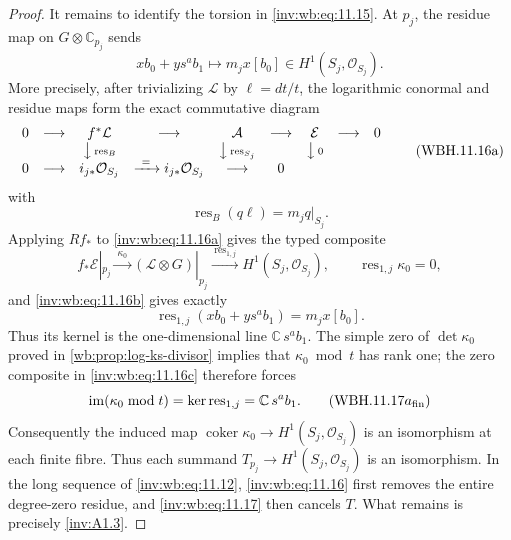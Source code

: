 \begin{proof}
It remains to identify the torsion in \eqref{inv:wb:eq:11.15}.  At $p_j$, the residue map on
$G\otimes\mathbb C_{p_j}$ sends
\[
 x b_0+y s^ab_1\longmapsto m_jx[b_0]
 \in H^1(S_j,\mathcal O_{S_j}).
\tag{WBH.11.17}\label{inv:wb:eq:11.17}
\]
More precisely, after trivializing $\mathcal L$ by
$\ell=dt/t$, the logarithmic conormal and residue maps form the exact
commutative diagram
\[
\begin{array}{ccccccccc}
0&\longrightarrow&f^*\mathcal L&\longrightarrow&\mathcal A
 &\longrightarrow&\mathcal E&\longrightarrow&0\\
&&\big\downarrow\,{\scriptstyle\operatorname{res}_B}
&&\big\downarrow\,{\scriptstyle\operatorname{res}_{S_j}}
&&\big\downarrow\,{\scriptstyle 0}&&\\
0&\longrightarrow&i_{j*}\mathcal O_{S_j}&\xrightarrow{\ =\ }
 i_{j*}\mathcal O_{S_j}&\longrightarrow&0&&
\end{array}
\tag{WBH.11.16a}\label{inv:wb:eq:11.16a}
\]
with
\[
 \operatorname{res}_B(q\ell)=m_jq|_{S_j}.
\tag{WBH.11.16b}\label{inv:wb:eq:11.16b}
\]
Applying $Rf_*$ to \eqref{inv:wb:eq:11.16a} gives the typed composite
\[
 f_*\mathcal E|_{p_j}\xrightarrow{\ \kappa_0\ }
 (\mathcal L\otimes G)|_{p_j}
 \xrightarrow{\ \operatorname{res}_{1,j}\ }
 H^1(S_j,\mathcal O_{S_j}),
 \qquad \operatorname{res}_{1,j}\kappa_0=0,
\tag{WBH.11.16c}\label{inv:wb:eq:11.16c}
\]
and \eqref{inv:wb:eq:11.16b} gives exactly
\[
 \operatorname{res}_{1,j}(xb_0+ys^ab_1)=m_jx[b_0].
\]
Thus its kernel is the one-dimensional line
$\mathbb C\,s^ab_1$.  The simple zero of $\det\kappa_0$ proved in
\cref{wb:prop:log-ks-divisor} implies that $\kappa_0\bmod t$ has rank one;
the zero composite in \eqref{inv:wb:eq:11.16c} therefore forces
\[
 \operatorname{im}(\kappa_0\bmod t)
 =\ker\operatorname{res}_{1,j}
 =\mathbb C\,s^ab_1.
\tag{WBH.$11.17a_{\mathrm{fin}}$}\label{inv:wb:eq:11.17a-fin}
\]
Consequently the induced map
$\operatorname{coker}\kappa_0\to H^1(S_j,\mathcal O_{S_j})$ is an
isomorphism at each finite fibre.  Thus each summand
$T_{p_j}\to H^1(S_j,\mathcal O_{S_j})$ is an isomorphism.  In the long
sequence of \eqref{inv:wb:eq:11.12}, \eqref{inv:wb:eq:11.16} first removes the entire degree-zero residue,
and \eqref{inv:wb:eq:11.17} then cancels $T$.  What remains is precisely \cref{inv:A1.3}.
\end{proof}

